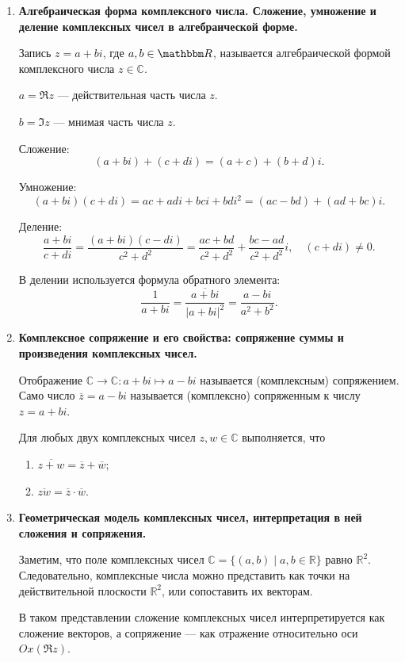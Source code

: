 \begin{enumerate}
\item \textbf{Алгебраическая форма комплексного числа. Сложение, умножение и деление комплексных чисел в алгебраической форме.}

Запись $z = a + bi$, где $a, b \in \R$, называется алгебраической формой комплексного числа $z \in \mathbb{C}$.

$a = \Re z$ — действительная часть числа $z$.

$b = \Im z$ — мнимая часть числа $z$.

Сложение: $$ (a + bi) + (c + di) = (a + c) + (b + d)i.$$

Умножение: $$(a + bi)(c + di) = ac + adi + bci + bdi^2 = (ac - bd) + (ad + bc)i.$$

Деление: $$\frac{a + bi}{c + di} = \frac{(a + bi)(c - di)}{c^2 + d^2} = \frac{ac + bd}{c^2 + d^2} + \frac{bc - ad}{c^2 + d^2}i, \quad (c + di) \neq 0.$$

В делении используется формула обратного элемента:
$$
\frac{1}{a + bi} = \frac{\overline{a + bi}}{|a + bi|^2} = \frac{a - bi}{a^2 + b^2}.
$$

\item \textbf{Комплексное сопряжение и его свойства: сопряжение суммы и произведения комплексных чисел.}

Отображение $\mathbb{C} \rightarrow \mathbb{C} : a + bi \mapsto a - bi$ называется (комплексным) сопряжением. Само число $\overline{z} = a - bi$ называется (комплексно) сопряженным к числу $z = a + bi$. 

Для любых двух комплексных чисел $z, w \in \mathbb{C}$ выполняется, что
\begin{enumerate}
\item $\overline{z + w} = \overline{z} + \overline{w}$;
\item $\overline{zw} = \overline{z} \cdot \overline{w}$.
\end{enumerate}

\item \textbf{Геометрическая модель комплексных чисел, интерпретация в ней сложения и сопряжения.}

Заметим, что поле комплексных чисел $\mathbb{C} = \{(a, b) \mid a, b \in \mathbb{R}\}$ равно $\mathbb{R}^2$. Следовательно, комплексные числа можно представить как точки на действительной плоскости $\mathbb{R}^2$, или сопоставить их векторам.

В таком представлении сложение комплексных чисел интерпретируется как сложение векторов, а сопряжение — как отражение относительно оси $Ox (\Re z)$.


\end{enumerate}
